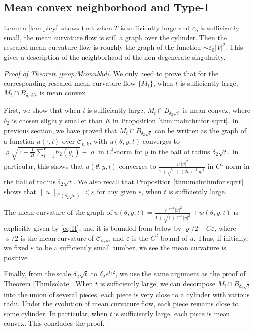 \documentclass[11pt]{amsart}
\numberwithin{equation}{section}
\numberwithin{equation}{section}
\newcommand{\eps}{\varepsilon}
\newcommand{\cC}{\mathcal{C}}
\begin{document}
	
	\subsection{Mean convex neighborhood and Type-I}\label{SS:Mean convex neighborhood and Type-I}
	Lemma \ref{lem:plcyl} shows that when $T$ is sufficiently large and $\eps_0$ is sufficiently small, the mean curvature flow is still a graph over the cylinder. Then the rescaled mean curvature flow is roughly the graph of the function $\sim \eps_0|V|^2$. This gives a description of the neighborhood of the non-degenerate singularity. 
	
	
	
	\begin{proof}[Proof of Theorem \ref{prop:Mconnbhd}]
		We only need to prove that for the corresponding rescaled mean curvature flow $\{M_t\}$, when $t$ is sufficiently large, $M_t\cap B_{\delta_2e^{t/2}}$ is mean convex.
		
		First, we show that when $t$ is sufficiently large, $M_t\cap B_{\delta_2\sqrt{t}}$ is mean convex, where $\delta_2$ is chosen slightly smaller than $K$ in Proposition \ref{thm:mainthmfor sqrtt}. In previous section, we have proved that $M_t\cap B_{\delta_2\sqrt{t}}$ can be written as the graph of a function $u(\cdot,t)$ over $\cC_{n,k}$, with $u(\theta,y,t)$ converges to $\varrho\sqrt{1+\frac{1}{2t}{\sum_{i=1}^k h_2(y_i)}}-\varrho$ in $C^1$-norm for $y$ in the ball of radius $\delta_2\sqrt{t}$. In particular, this shows that $u(\theta,y,t)$ converges to $\frac{\varrho|y|^2}{1+\sqrt{1+(2t)^{-1}|y|^2}}$ in $C^1$-norm in the ball of radius $\delta_2\sqrt{t}$. We also recall that Proposition \ref{thm:mainthmfor sqrtt} shows that $\|u\|_{C^2(\delta_2\sqrt{t})}<\eps$ for any given $\eps$, when $t$ is sufficiently large.
		
		The mean curvature of the graph of $u(\theta,y,t)=\frac{\varrho t^{-1}|y|^2}{1+\sqrt{1+t^{-1}|y|^2}}+w(\theta,y,t)$ is explicitly given by \eqref{eq:H}, and it is bounded from below by $\varrho/2-C\eps$, where $\varrho/2$ is the mean curvature of $\cC_{n,k}$, and $\eps$ is the $C^2$-bound of $u$. Thus, if initially, we fixed $\eps$ to be a sufficiently small number, we see the mean curvature is positive.
		
		Finally, from the scale $\delta_2\sqrt{t}$ to $\delta_2 e^{t/2}$, we use the same argument as the proof of Theorem \ref{ThmIsolate}. When $t$ is sufficiently large, we can decompose $M_t\cap B_{\delta_2\sqrt{t}}$ into the union of several pieces, each piece is very close to a cylinder with various radii. Under the evolution of mean curvature flow, each piece remains close to some cylinder. In particular, when $t$ is sufficiently large, each piece is mean convex. This concludes the proof.
		
	\end{proof}
	
\end{document}
